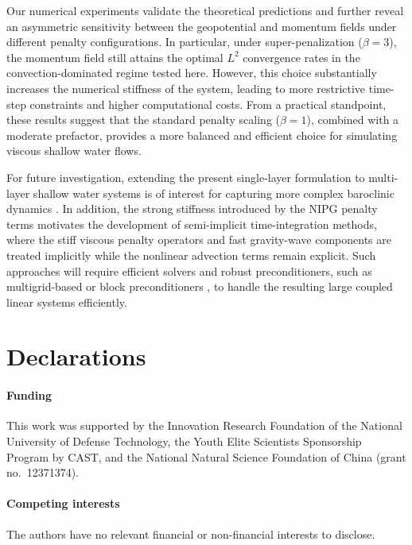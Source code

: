 \documentclass[pdflatex,sn-mathphys-num]{sn-jnl}%
\theoremstyle{thmstyleone}%
\theoremstyle{thmstyletwo}%
\theoremstyle{thmstylethree}%
\begin{document}
Our numerical experiments validate the theoretical predictions and further reveal an asymmetric sensitivity between the geopotential and momentum fields under different penalty configurations. In particular, under super-penalization ($\beta=3$), the momentum field still attains the optimal $L^2$ convergence rates in the convection-dominated regime tested here. However, this choice substantially increases the numerical stiffness of the system, leading to more restrictive time-step constraints and higher computational costs.
From a practical standpoint, these results suggest that the standard penalty scaling ($\beta=1$), combined with a moderate prefactor, provides a more balanced and efficient choice for simulating viscous shallow water flows.

For future investigation, extending the present single-layer formulation to multi-layer shallow water systems is of interest for capturing more complex baroclinic dynamics \cite{Gahounzo2026}. In addition, the strong stiffness introduced by the NIPG penalty terms motivates the development of semi-implicit time-integration methods, where the stiff viscous penalty operators and fast gravity-wave components are treated implicitly while the nonlinear advection terms remain explicit. Such approaches will require efficient solvers and robust preconditioners, such as multigrid-based \cite{Betteridge2021} or block preconditioners \cite{Cotter2023}, to handle the resulting large coupled linear systems efficiently.

\backmatter

\section*{Declarations}

\paragraph{Funding}
This work was supported by the Innovation Research Foundation of the National University of Defense Technology, the Youth Elite Scientists Sponsorship Program by CAST, and the National Natural Science Foundation of China (grant no.~12371374).

\paragraph{Competing interests}
The authors have no relevant financial or non-financial interests to disclose.
\end{document}
